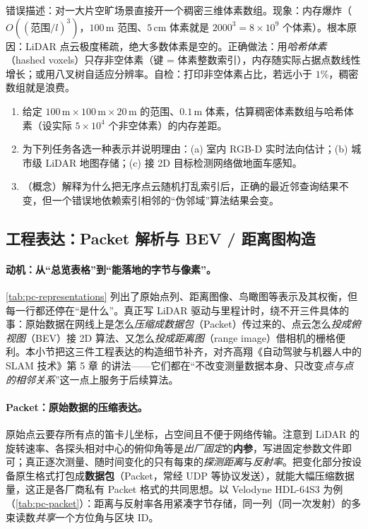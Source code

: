 \begin{pitfall}
错误描述：对一大片空旷场景直接开一个稠密三维体素数组。现象：内存爆炸（$O((\text{范围}/l)^3)$，$100\,\mathrm{m}$ 范围、$5\,\mathrm{cm}$ 体素就是 $2000^3=8\times10^9$ 个体素）。根本原因：LiDAR 点云极度稀疏，绝大多数体素是空的。正确做法：用\emph{哈希体素}（hashed voxels）只存非空体素（键 = 体素整数索引），内存随实际占据点数线性增长；或用八叉树自适应分辨率。自检：打印非空体素占比，若远小于 $1\%$，稠密数组就是浪费。
\end{pitfall}

\begin{practice}
\begin{enumerate}
  \item 给定 $100\,\mathrm{m}\times100\,\mathrm{m}\times20\,\mathrm{m}$ 的范围、$0.1\,\mathrm{m}$ 体素，估算稠密体素数组与哈希体素（设实际 $5\times10^4$ 个非空体素）的内存差距。
  \item 为下列任务各选一种表示并说明理由：(a) 室内 RGB-D 实时法向估计；(b) 城市级 LiDAR 地图存储；(c) 接 2D 目标检测网络做地面车感知。
  \item （概念）解释为什么把无序点云随机打乱索引后，正确的最近邻查询结果不变，但一个错误地依赖索引相邻的“伪邻域”算法结果会变。
\end{enumerate}
\end{practice}

\subsection{工程表达：Packet 解析与 BEV / 距离图构造}
\label{sec:pc-eng-rep}

\paragraph{动机：从“总览表格”到“能落地的字节与像素”。}
\cref{tab:pc-representations} 列出了原始点列、距离图像、鸟瞰图等表示及其权衡，但每一行都还停在“是什么”。真正写 LiDAR 驱动与里程计时，绕不开三件具体的事：原始数据在网线上是怎么\emph{压缩成数据包}（Packet）传过来的、点云怎么\emph{投成俯视图}（BEV）接 2D 算法、又怎么\emph{投成距离图}（range image）借相机的栅格便利。本小节把这三件工程表达的构造细节补齐，对齐高翔《自动驾驶与机器人中的 SLAM 技术》第 5 章\cite{gao2023slamad} 的讲法——它们都在“不改变测量数据本身、只改变\emph{点与点的相邻关系}”这一点上服务于后续算法。

\paragraph{Packet：原始数据的压缩表达。}
原始点云要存所有点的笛卡儿坐标，占空间且不便于网络传输。注意到 LiDAR 的旋转速率、各探头相对中心的俯仰角等是\emph{出厂固定}的\textbf{内参}，写进固定参数文件即可；真正逐次测量、随时间变化的只有每束的\emph{探测距离}与\emph{反射率}。把变化部分按设备原生格式打包成\textbf{数据包}（Packet，常经 UDP 等协议发送），就能大幅压缩数据量，这正是各厂商私有 Packet 格式的共同思想\cite{gao2023slamad}。以 Velodyne HDL-64S3 为例（\cref{tab:pc-packet}）：距离与反射率各用紧凑字节存储，同一列（同一次发射）的多束读数\emph{共享}一个方位角与区块 ID。

